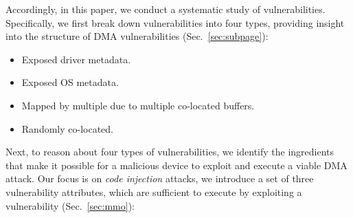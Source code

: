 
Accordingly, in this paper, we conduct a systematic study of \subpage{} vulnerabilities. Specifically, we first break down \subpage{} vulnerabilities into four types, providing insight into the structure of DMA vulnerabilities (Sec.~\ref{sec:subpage}):
\begin{itemize}
    \item Exposed driver metadata.
    \item Exposed OS metadata. 
    \item Mapped by multiple \iova due to multiple co-located buffers.
    \item Randomly co-located.
\end{itemize}


Next, to reason about \DIFdelbegin {}\DIFdelend \DIFaddbegin {}\DIFaddend four types of \subpage{} vulnerabilities, we identify the ingredients that make it possible for a malicious device to exploit \DIFdelbegin {}\DIFdelend \DIFaddbegin {}\DIFaddend and execute a viable DMA attack.
Our focus is on \emph{code injection} attacks\DIFdelbegin {}\DIFdelend \DIFaddbegin {}\DIFaddend , we introduce a set of three vulnerability attributes, which are sufficient to execute \DIFdelbegin {}\DIFdelend \DIFaddbegin {}\DIFaddend by exploiting a \subpage{} vulnerability (Sec.~\ref{sec:mmo}):

